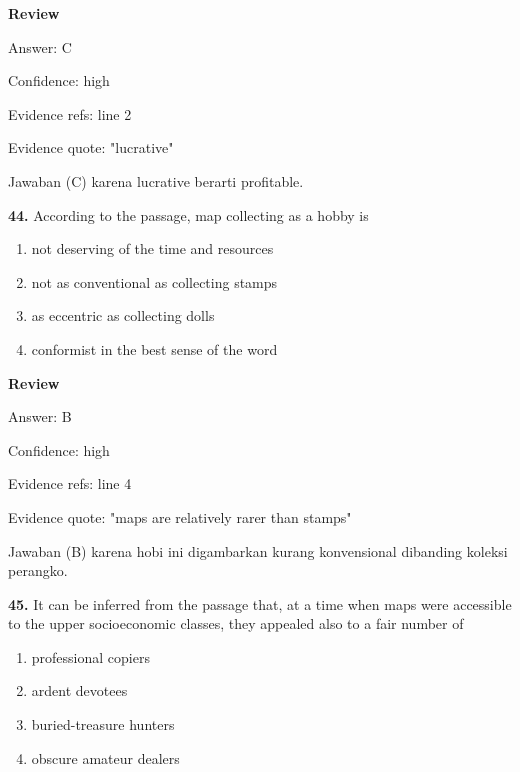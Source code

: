 \documentclass[12pt]{article}
\begin{document}
\par
\begingroup
\setlength{\parskip}{0pt}
\setlength{\parindent}{0pt}
\textbf{Review}\par
Answer: C\par
Confidence: high\par
Evidence refs: line 2\par
Evidence quote: "lucrative"\par
Jawaban (C) karena lucrative berarti profitable.\par
\endgroup
\par
\vspace{0.25\baselineskip}
\noindent\textbf{44.} According to the passage, map collecting as a hobby is
\begin{enumerate}[label=(\Alph*),leftmargin=*,itemsep=0.2em]
\item not deserving of the time and resources
\item not as conventional as collecting stamps
\item as eccentric as collecting dolls
\item conformist in the best sense of the word
\end{enumerate}
\par
\begingroup
\setlength{\parskip}{0pt}
\setlength{\parindent}{0pt}
\textbf{Review}\par
Answer: B\par
Confidence: high\par
Evidence refs: line 4\par
Evidence quote: "maps are relatively rarer than stamps"\par
Jawaban (B) karena hobi ini digambarkan kurang konvensional dibanding koleksi perangko.\par
\endgroup
\par
\vspace{0.25\baselineskip}
\noindent\textbf{45.} It can be inferred from the passage that, at a time when maps were accessible to the upper socioeconomic classes, they appealed also to a fair number of
\begin{enumerate}[label=(\Alph*),leftmargin=*,itemsep=0.2em]
\item professional copiers
\item ardent devotees
\item buried-treasure hunters
\item obscure amateur dealers
\end{enumerate}
\par
\begingroup
\setlength{\parskip}{0pt}
\end{document}
